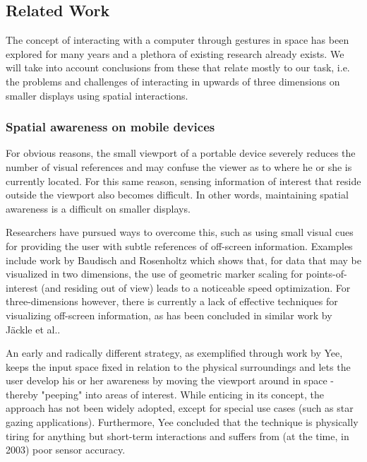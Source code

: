 









\subsection{Related Work}

The concept of interacting with a computer through gestures in space has been explored for many years and a plethora of existing research already exists. We will take into account conclusions from these that relate mostly to our task, i.e. the problems and challenges of interacting in upwards of three dimensions on smaller displays using spatial interactions.


\subsubsection{Spatial awareness on mobile devices}

For obvious reasons, the small viewport of a portable device severely reduces the number of visual references and may confuse  the viewer as to where he  or she is currently located. For this same reason, sensing information  of interest that reside outside the viewport also becomes difficult. In other words, maintaining spatial awareness is a difficult on smaller displays.

Researchers have pursued ways to overcome this, such as using small visual cues for providing the user with subtle references of off-screen information.  Examples include work by Baudisch and Rosenholtz\cite{Halo} which shows that, for data that may be visualized in two dimensions, the use of geometric marker scaling for points-of-interest (and residing out of view) leads to a noticeable speed optimization. For three-dimensions however,  there is currently a lack of effective techniques for visualizing off-screen information, as has been concluded in similar work by Jäckle et al.\cite{OffScreenDims}.

An early and radically different strategy, as exemplified through work by Yee\cite{peep}, keeps the input space fixed in relation to the physical surroundings and lets the user develop his or her awareness by moving the viewport around in space - thereby "peeping" into areas of interest. While enticing in its concept, the approach has not been widely adopted, except for special use cases (such as star gazing applications). Furthermore, Yee concluded that the technique is physically tiring for anything but short-term interactions and suffers from (at the time, in 2003) poor sensor accuracy.

